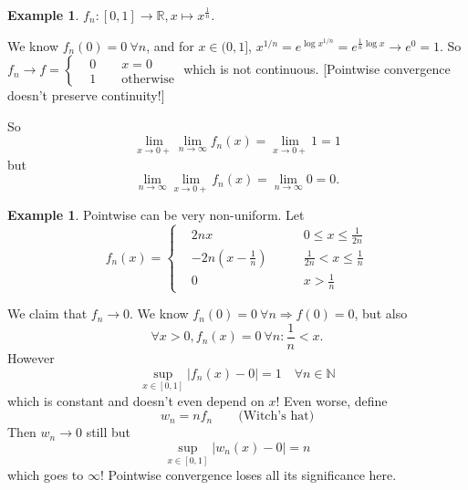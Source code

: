 \documentclass[a4paper]{article}
\theoremstyle{definition}
\newtheorem{example}[defn]{Example}
\begin{document}
\begin{example}
$f_n:[0,1]\rightarrow \mathbb R, x\mapsto x^{\frac1n}$.
\begin{center}
\end{center}
We know $f_n(0)=0 \ \forall n$, and for $x\in(0,1]$, $x^{1/n}=e^{\log x^{1/n}} = e^{\frac1n \log x} \rightarrow e^0 =1$. So $f_n \rightarrow f=\left\{\begin{aligned}&0\qquad x=0\\&1\qquad \text{otherwise}\end{aligned} \right.$ which is not continuous. [Pointwise convergence doesn't preserve continuity!]

So
\[
\lim_{x\rightarrow 0+}\lim_{n\rightarrow \infty} f_n(x)=\lim_{x\rightarrow 0+} 1 = 1
\]
but
\[
\lim_{n\rightarrow \infty} \lim_{x\rightarrow 0+} f_n(x)=\lim_{n\rightarrow \infty} 0 = 0.
\]
\end{example}

\begin{example}
Pointwise can be very non-uniform. Let
\[
f_n(x)=\left\{\begin{aligned}
&2nx\qquad &0\leq x\leq \frac{1}{2n} \\ &-2n\left(x-\frac1n \right)\qquad &\frac{1}{2n}< x \leq \frac1n \\ &0\qquad &x>\frac1n
\end{aligned} \right.
\]
\begin{center}
\end{center}
We claim that $f_n\rightarrow 0$. We know $f_n(0)=0 \ \forall n \Rightarrow f(0)=0$, but also
\[
\forall x>0, f_n(x)=0 \ \forall n: \frac1n <x .
\]
However
\[
\underset{x\in [0,1]}{\sup} |f_n(x)-0|=1\quad \forall n\in \mathbb N
\]
which is constant and doesn't even depend on $x$! Even worse, define
\[
w_n=nf_n\qquad \text{(Witch's hat)}
\]
Then $w_n\rightarrow 0$ still but
\[
\underset{x\in [0,1]}{\sup} |w_n(x)-0|=n
\]
which goes to $\infty$! Pointwise convergence loses all its significance here.
\end{example}
\end{document}
